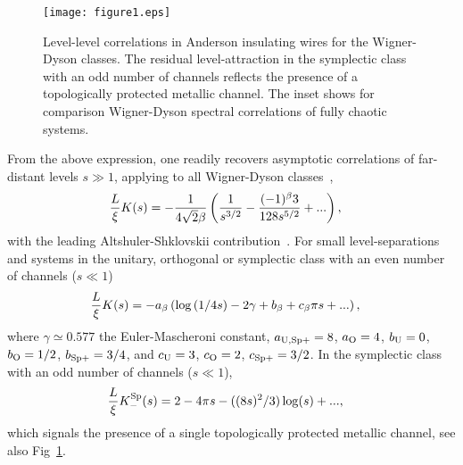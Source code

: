 \documentclass[twocolumn,showpacs,aps,prl]{revtex4}
\begin{document}
\begin{figure}[tt]
\begin{center}
\texttt{[image: figure1.eps]}
\end{center}
\vspace{-15pt}
\caption{Level-level correlations in Anderson insulating wires 
for the Wigner-Dyson classes. The residual level-attraction  
in the symplectic class with an odd number of channels
reflects the presence of a topologically protected metallic channel.
The inset shows for comparison Wigner-Dyson spectral correlations 
of fully chaotic systems.
}
\label{fig1}
\end{figure} 




From the above expression,  
one readily recovers asymptotic correlations 
of far-distant levels $s\gg1$, 
applying to all Wigner-Dyson 
classes~\cite{Gradsteyn}, 
\begin{align}
\label{lwasympt}
{L\over\xi}
K(s)
&= 
-
{1\over 4\sqrt{2}\beta }
\left(
{1\over s^{3/2}}
-
{(-1)^\beta 3\over 128s^{5/2}}
+ ...
\right), 
\end{align}
with the leading Altshuler-Shklovskii 
contribution~\cite{AltshulerShlovskii1,AkkermansMontambaux}. 
For small level-separations 
and systems 
 in the unitary, orthogonal or symplectic 
class with an even number of channels ($s \ll 1$) 
\begin{align}
\label{swasympt}
{L\over\xi}
K(s)
&= 
-
a_\beta
\left(
\log\left( 1/4s \right)
-
2\gamma+
b_\beta
+
c_\beta \pi s
+
...
\right), 
\end{align}
where 
 $\gamma\simeq0.577$ the Euler-Mascheroni constant, 
 $a_{\rm U,Sp+}=8$, $a_{\rm O}=4$,
$b_{\rm U}=0$, $b_{\rm O}=1/2$, $b_{\rm Sp+}=3/4$,
and
$c_{\rm U}=3$, $c_{\rm O}=2$, $c_{\rm Sp+}=3/2$.
In the symplectic class with an odd number of channels ($s\ll1$), 
\begin{align}
{L\over\xi}
K^{\rm Sp}_-(s)
&= 
2 - 4\pi s - 
((8s)^2/3)
\log(s)
+..., 
\end{align}
which signals the presence of a single  
topologically protected metallic channel, see also Fig~\ref{fig1}. 
\end{document}
